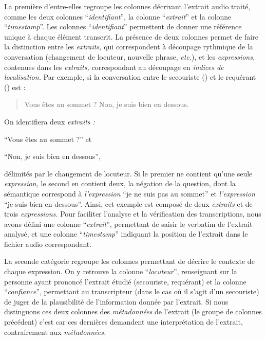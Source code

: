 %
La première d'entre-elles regroupe les colonnes décrivant l'extrait
audio traité, comme les deux colonnes \enquote{\emph{identifiant}}, la
colonne \enquote{\emph{extrait}} et la colonne
\enquote{\emph{timestamp}}. Les colonnes \enquote{\emph{identifiant}}
permettent de donner une référence unique à chaque élément
transcrit. La présence de deux colonnes permet de faire la distinction
entre les \emph{extraits,} qui correspondent à découpage rythmique de
la conversation (changement de locuteur, nouvelle phrase,
\emph{etc.}), et les \emph{expressions,} contenues dans les
\emph{extraits,} correspondant au découpage en \emph{indices de
  localisation.} Par exemple, si la conversation entre le secouriste
() et le requérant () est :
%
\begin{quote}
  \begin{dialogue}
    \Sec Vous êtes au sommet ?
    \Req Non, je suis bien en dessous.
  \end{dialogue}
\end{quote}
%
On identifiera deux \emph{extraits :}
%
\begin{enumerate*}[label=(\alph*)]
\item \enquote{Vous êtes au sommet ?} et
\item \enquote{Non, je suis bien en dessous},
\end{enumerate*}
%
délimités par le changement de locuteur. Si le premier ne contient
qu'une seule \emph{expression,} le second en contient deux, la
négation de la question, dont la sémantique correspond à
\emph{l'expression} \enquote{je ne suis pas au sommet} et
\emph{l'expression} \enquote{je suis bien en dessous}. Ainsi, cet
exemple est composé de deux \emph{extraits} et de trois
\emph{expressions.}
%
Pour faciliter l'analyse et la vérification des transcriptions, nous
avons défini une colonne \enquote{\emph{extrait}}, permettant de
saisir le verbatim de l'extrait analysé, et une colonne
\enquote{\emph{timestamp}} indiquant la position de l'extrait dans le
fichier audio correspondant.

La seconde catégorie regroupe les colonnes permettant de décrire le
contexte de chaque expression. On y retrouve la colonne
\enquote{\emph{locuteur}}, renseignant sur la personne ayant prononcé
l'extrait étudié (\eg secouriste, requérant) et la colonne
\enquote{\emph{confiance}}, permettant au transcripteur (dans le cas
où il s'agit d'un secouriste) de juger de la plausibilité de
l'information donnée par l'extrait. Si nous distinguons ces deux
colonnes des \emph{métadonnées} de l'extrait (\ie le groupe de
colonnes précédent) c'est car ces dernières demandent une
interprétation de l'extrait, contrairement aux \emph{métadonnées.}

